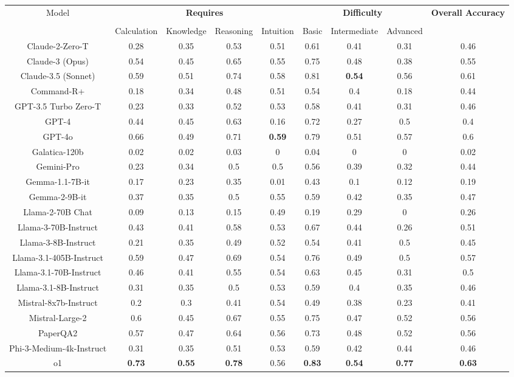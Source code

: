 \begin{tabular}{ccccccccc}
\toprule
\multirow{3}{*}{Model} & \multicolumn{4}{c}{\textbf{Requires}} & \multicolumn{3}{c}{\textbf{Difficulty}} & \multirow{3}{*}{\textbf{Overall Accuracy}}\\\cmidrule(lr){2-5} \cmidrule(lr){6-8}\\
 & Calculation & Knowledge & Reasoning & Intuition & Basic & Intermediate & Advanced &  \\
\midrule
Claude-2-Zero-T & 0.28 & 0.35 & 0.53 & 0.51 & 0.61 & 0.41 & 0.31 & 0.46 \\
Claude-3 (Opus) & 0.54 & 0.45 & 0.65 & 0.55 & 0.75 & 0.48 & 0.38 & 0.55 \\
Claude-3.5 (Sonnet) & 0.59 & 0.51 & 0.74 & 0.58 & 0.81 & \textbf{0.54} & 0.56 & 0.61 \\
Command-R+ & 0.18 & 0.34 & 0.48 & 0.51 & 0.54 & 0.4 & 0.18 & 0.44 \\
GPT-3.5 Turbo Zero-T & 0.23 & 0.33 & 0.52 & 0.53 & 0.58 & 0.41 & 0.31 & 0.46 \\
GPT-4 & 0.44 & 0.45 & 0.63 & 0.16 & 0.72 & 0.27 & 0.5 & 0.4 \\
GPT-4o & 0.66 & 0.49 & 0.71 & \textbf{0.59} & 0.79 & 0.51 & 0.57 & 0.6 \\
Galatica-120b & 0.02 & 0.02 & 0.03 & 0 & 0.04 & 0 & 0 & 0.02 \\
Gemini-Pro & 0.23 & 0.34 & 0.5 & 0.5 & 0.56 & 0.39 & 0.32 & 0.44 \\
Gemma-1.1-7B-it & 0.17 & 0.23 & 0.35 & 0.01 & 0.43 & 0.1 & 0.12 & 0.19 \\
Gemma-2-9B-it & 0.37 & 0.35 & 0.5 & 0.55 & 0.59 & 0.42 & 0.35 & 0.47 \\
Llama-2-70B Chat & 0.09 & 0.13 & 0.15 & 0.49 & 0.19 & 0.29 & 0 & 0.26 \\
Llama-3-70B-Instruct & 0.43 & 0.41 & 0.58 & 0.53 & 0.67 & 0.44 & 0.26 & 0.51 \\
Llama-3-8B-Instruct & 0.21 & 0.35 & 0.49 & 0.52 & 0.54 & 0.41 & 0.5 & 0.45 \\
Llama-3.1-405B-Instruct & 0.59 & 0.47 & 0.69 & 0.54 & 0.76 & 0.49 & 0.5 & 0.57 \\
Llama-3.1-70B-Instruct & 0.46 & 0.41 & 0.55 & 0.54 & 0.63 & 0.45 & 0.31 & 0.5 \\
Llama-3.1-8B-Instruct & 0.31 & 0.35 & 0.5 & 0.53 & 0.59 & 0.4 & 0.35 & 0.46 \\
Mistral-8x7b-Instruct & 0.2 & 0.3 & 0.41 & 0.54 & 0.49 & 0.38 & 0.23 & 0.41 \\
Mistral-Large-2 & 0.6 & 0.45 & 0.67 & 0.55 & 0.75 & 0.47 & 0.52 & 0.56 \\
PaperQA2 & 0.57 & 0.47 & 0.64 & 0.56 & 0.73 & 0.48 & 0.52 & 0.56 \\
Phi-3-Medium-4k-Instruct & 0.31 & 0.35 & 0.51 & 0.53 & 0.59 & 0.42 & 0.44 & 0.46 \\
o1 & \textbf{0.73} & \textbf{0.55} & \textbf{0.78} & 0.56 & \textbf{0.83} & \textbf{0.54} & \textbf{0.77} & \textbf{0.63} \\
\bottomrule
\end{tabular}
